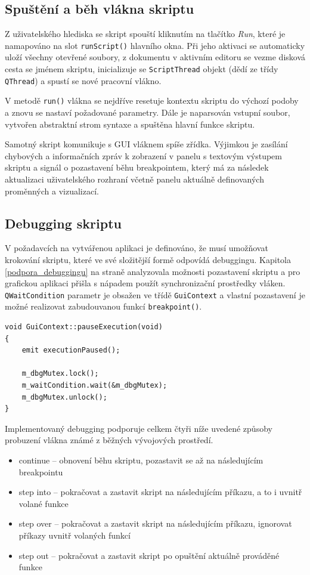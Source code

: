 \documentclass[11pt,twoside,a4paper]{book}
\begin{document}
\subsection{Spuštění a běh vlákna skriptu}

Z uživatelského hlediska se skript spouští kliknutím na tlačítko \textit{Run}, které je namapováno na slot \texttt{runScript()} hlavního okna. Při jeho aktivaci se automaticky uloží všechny otevřené soubory, z dokumentu v aktivním editoru se vezme disková cesta se jménem skriptu, inicializuje se \texttt{ScriptThread} objekt (dědí ze třídy \texttt{QThread}) a spustí se nové pracovní vlákno.

V metodě \texttt{run()} vlákna se nejdříve resetuje kontextu skriptu do výchozí podoby a znovu se nastaví požadované parametry. Dále je naparsován vstupní soubor, vytvořen abstraktní strom syntaxe a spuštěna hlavní funkce skriptu.

Samotný skript komunikuje s GUI vláknem spíše zřídka. Výjimkou je zasílání chybových a informačních zpráv k zobrazení v panelu s textovým výstupem skriptu a signál o pozastavení běhu breakpointem, který má za následek aktualizaci uživatelského rozhraní včetně panelu aktuálně definovaných proměnných a vizualizací.


\subsection{Debugging skriptu}

V požadavcích na vytvářenou aplikaci je definováno, že musí umožňovat krokování skriptu, které ve své složitější formě odpovídá debuggingu. Kapitola \ref{podpora_debuggingu} na straně \pageref{podpora_debuggingu} analyzovala možnosti pozastavení skriptu a pro grafickou aplikaci přišla s nápadem použít synchronizační prostředky vláken. \texttt{QWaitCondition} parametr je obsažen ve třídě \texttt{GuiContext} a vlastní pozastavení je možné realizovat zabudouvanou funkcí \texttt{breakpoint()}.

\begin{verbatim}
void GuiContext::pauseExecution(void)
{
    emit executionPaused();

    m_dbgMutex.lock();
    m_waitCondition.wait(&m_dbgMutex);
    m_dbgMutex.unlock();
}
\end{verbatim}

Implementovaný debugging podporuje celkem čtyři níže uvedené způsoby probuzení vlákna známé z běžných vývojových prostředí.

\begin{itemize}
\item continue -- obnovení běhu skriptu, pozastavit se až na následujícím breakpointu
\item step into -- pokračovat a zastavit skript na následujícím příkazu, a to i uvnitř volané funkce
\item step over -- pokračovat a zastavit skript na následujícím příkazu, ignorovat příkazy uvnitř volaných funkcí
\item step out -- pokračovat a zastavit skript po opuštění aktuálně prováděné funkce
\end{itemize}
\end{document}
